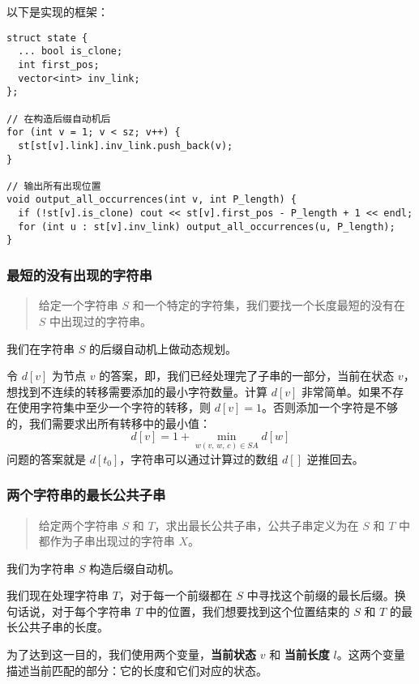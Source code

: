 以下是实现的框架：

\begin{verbatim}
struct state {
  ... bool is_clone;
  int first_pos;
  vector<int> inv_link;
};

// 在构造后缀自动机后
for (int v = 1; v < sz; v++) {
  st[st[v].link].inv_link.push_back(v);
}

// 输出所有出现位置
void output_all_occurrences(int v, int P_length) {
  if (!st[v].is_clone) cout << st[v].first_pos - P_length + 1 << endl;
  for (int u : st[v].inv_link) output_all_occurrences(u, P_length);
}
\end{verbatim}

\subsubsection{最短的没有出现的字符串}

\begin{quote}
给定一个字符串 \(S\) 和一个特定的字符集，我们要找一个长度最短的没有在
\(S\) 中出现过的字符串。
\end{quote}

我们在字符串 \(S\) 的后缀自动机上做动态规划。

令 \(d[v]\) 为节点 \(v\)
的答案，即，我们已经处理完了子串的一部分，当前在状态
\(v\)，想找到不连续的转移需要添加的最小字符数量。计算 \(d[v]\)
非常简单。如果不存在使用字符集中至少一个字符的转移，则
\(d[v]=1\)。否则添加一个字符是不够的，我们需要求出所有转移中的最小值：
\[
d[v]=1+\min_{w(v,\,w,\,c)\in SA}d[w]
\]
问题的答案就是 \(d[t_0]\)，字符串可以通过计算过的数组 \(d[]\) 逆推回去。

\subsubsection{两个字符串的最长公共子串}

\begin{quote}
给定两个字符串 \(S\) 和 \(T\)，求出最长公共子串，公共子串定义为在 \(S\)
和 \(T\) 中都作为子串出现过的字符串 \(X\)。
\end{quote}

我们为字符串 \(S\) 构造后缀自动机。

我们现在处理字符串 \(T\)，对于每一个前缀都在 \(S\)
中寻找这个前缀的最长后缀。换句话说，对于每个字符串 \(T\)
中的位置，我们想要找到这个位置结束的 \(S\) 和 \(T\)
的最长公共子串的长度。

为了达到这一目的，我们使用两个变量，\textbf{当前状态} \(v\) 和
\textbf{当前长度}
\(l\)。这两个变量描述当前匹配的部分：它的长度和它们对应的状态。

